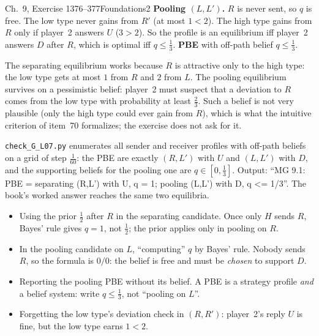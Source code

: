 \begin{exsol}{\MG{} Ch.~9, Exercise 1}{376--377}{Foundations}{2}
\textbf{Pooling $(L, L')$.} $R$ is never sent, so $q$ is free. The low type never gains from $R'$
(at most $1 < 2$). The high type gains from $R$ only if player~2 answers $U$ ($3 > 2$). So the profile is
an equilibrium iff player~2 answers $D$ after $R$, which is optimal iff $q \le \frac13$. \textbf{PBE} with
off-path belief $q \le \frac13$.

\interp The separating equilibrium works because $R$ is attractive only to the high type: the low type
gets at most $1$ from $R$ and $2$ from $L$. The pooling equilibrium survives on a pessimistic belief:
player~2 must suspect that a deviation to $R$ comes from the low type with probability at least $\frac23$.
Such a belief is not very plausible (only the high type could ever gain from $R$), which is what the
intuitive criterion of item~70 formalizes; the exercise does not ask for it.

\verify \texttt{check\_G\_L07.py} enumerates all sender and receiver profiles with off-path beliefs on a
grid of step $\frac1{60}$: the PBE are exactly $(R, L')$ with $U$ and $(L, L')$ with $D$, and the supporting
beliefs for the pooling one are $q \in [0, \frac13]$. Output: ``MG 9.1: PBE = separating (R,L') with U, q = 1;
pooling (L,L') with D, q <= 1/3''. The book's worked answer reaches the same two equilibria.

\mistakes
\begin{itemize}
  \item Using the prior $\frac12$ after $R$ in the separating candidate. Once only $H$ sends $R$, Bayes' rule
  gives $q = 1$, not $\frac12$; the prior applies only in pooling on $R$.
  \item In the pooling candidate on $L$, ``computing'' $q$ by Bayes' rule. Nobody sends $R$, so the
  formula is $0/0$: the belief is free and must be \emph{chosen} to support $D$.
  \item Reporting the pooling PBE without its belief. A PBE is a strategy profile \emph{and} a belief system:
  write $q \le \frac13$, not ``pooling on $L$''.
  \item Forgetting the low type's deviation check in $(R, R')$: player~2's reply $U$ is fine, but the low
  type earns $1 < 2$.
\end{itemize}

\end{exsol}
